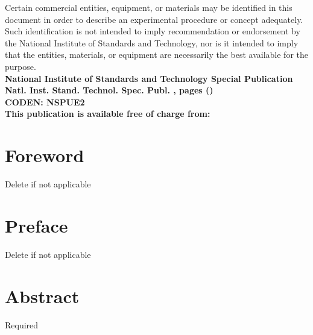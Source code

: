 \begin{titlepage}
\begin{flushright}
\footnotesize  Certain commercial entities, equipment, or materials may be identified in this document in order to describe an experimental procedure or concept adequately. Such identification is not intended to imply recommendation or endorsement by the National Institute of Standards and Technology, nor is it intended to imply that the entities, materials, or equipment are necessarily the best available for the purpose.\\
\vfill
\normalsize \textbf{National Institute of Standards and Technology Special Publication \pubnumber\\
Natl. Inst. Stand. Technol. Spec. Publ. \pubnumber, \pageref{LastPage} pages (\monthyear)} \\
\textbf{CODEN: NSPUE2}\\
\vspace{12pt}
\textbf{This publication is available free of charge from: \DOI}
\vfill
\end{flushright}
\end{titlepage}
\section*{Foreword}
\normalsize Delete if not applicable\\
\section*{Preface}
\normalsize Delete if not applicable\\
\section*{Abstract}
\normalsize Required\\
